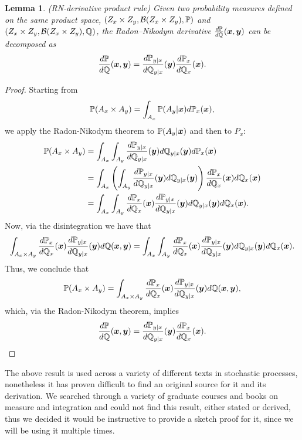 \documentclass[a4paper,12pt,twoside,openright]{report}
\newtheorem{lemma}{Lemma}
\theoremstyle{definition}
\begin{document}
\begin{lemma}\label{lemma:rn_des}(RN-derivative product rule)
Given two probability measures defined on the same product space,  $(Z_x \times Z_y, {\mathcal{B}}(Z_x \times Z_y) ,{\mathbb{P}})$ and $(Z_x \times Z_y, {\mathcal{B}}(Z_x \times Z_y) ,{\mathbb{Q}})$, the Radon–Nikodym derivative $\frac{d{\mathbb{P}}}{d{\mathbb{Q}}} ({\bm{x}},{\bm{y}})$ can be decomposed as
\begin{align}
    \frac{d{\mathbb{P}}}{d{\mathbb{Q}}} ({\bm{x}},{\bm{y}}) = \frac{d{\mathbb{P}}_{y|x}}{d{\mathbb{Q}}_{y|x}}({\bm{y}})\frac{d{\mathbb{P}}_x}{d{\mathbb{Q}}_x}({\bm{x}}).
\end{align}
\end{lemma}
\begin{proof}

Starting from
\begin{align*}
    {\mathbb{P}}(A_x \times A_y) =  \int_{A_x}{\mathbb{P}}(A_y | {\bm{x}})  d{\mathbb{P}}_{x}({\bm{x}}),
\end{align*}
we apply the Radon-Nikodym theorem to ${\mathbb{P}}(A_y | {\bm{x}})$ and then to $P_x$:
\begin{align*}
    {\mathbb{P}}(A_x \times A_y) &=  \int_{A_x}\int_{A_y} \frac{d{\mathbb{P}}_{y|x}}{d{\mathbb{Q}}_{y|x}}({\bm{y}}) d{\mathbb{Q}}_{y|x}({\bm{y}}) d{\mathbb{P}}_{x}({\bm{x}}) \\
     &= \int_{A_x}\left(\int_{A_y} \frac{d{\mathbb{P}}_{y|x}}{d{\mathbb{Q}}_{y|x}}({\bm{y}}) d{\mathbb{Q}}_{y|x}({\bm{y}})\right) \frac{d{\mathbb{P}}_{x}}{d{\mathbb{Q}}_{x}}({\bm{x}})d{\mathbb{Q}}_{x}({\bm{x}}) \\
      &= \int_{A_x}\int_{A_y}\frac{d{\mathbb{P}}_{x}}{d{\mathbb{Q}}_{x}}({\bm{x}})\frac{d{\mathbb{P}}_{y|x}}{d{\mathbb{Q}}_{y|x}}({\bm{y}}) d{\mathbb{Q}}_{y|x}({\bm{y}}) d{\mathbb{Q}}_{x}({\bm{x}}).
\end{align*}
Now, via the disintegration we have that
\begin{align*}
  \int_{A_x \times A_y} \frac{d{\mathbb{P}}_{x}}{d{\mathbb{Q}}_{x}}({\bm{x}})\frac{d{\mathbb{P}}_{y|x}}{d{\mathbb{Q}}_{y|x}}({\bm{y}}) d{\mathbb{Q}}({\bm{x}},{\bm{y}}) = \int_{A_x}\int_{A_y}\frac{d{\mathbb{P}}_{x}}{d{\mathbb{Q}}_{x}}({\bm{x}})\frac{d{\mathbb{P}}_{y|x}}{d{\mathbb{Q}}_{y|x}}({\bm{y}}) d{\mathbb{Q}}_{y|x}({\bm{y}}) d{\mathbb{Q}}_{x}({\bm{x}}).
\end{align*}
Thus, we conclude that
\begin{align*}
    {\mathbb{P}}(A_x \times A_y) = \int_{A_x \times A_y} \frac{d{\mathbb{P}}_{x}}{d{\mathbb{Q}}_{x}}({\bm{x}})\frac{d{\mathbb{P}}_{y|x}}{d{\mathbb{Q}}_{y|x}}({\bm{y}}) d{\mathbb{Q}}({\bm{x}},{\bm{y}}), 
\end{align*}
which, via the Radon-Nikodym theorem, implies
\begin{align*}
    \frac{d{\mathbb{P}}}{d{\mathbb{Q}}} ({\bm{x}},{\bm{y}}) = \frac{d{\mathbb{P}}_{y|x}}{d{\mathbb{Q}}_{y|x}}({\bm{y}})\frac{d{\mathbb{P}}_x}{d{\mathbb{Q}}_x}({\bm{x}}).
\end{align*}
\end{proof}
The above result is used across a variety of different texts in stochastic processes, nonetheless it has proven difficult to find an original source for it and its derivation. We searched through a variety of graduate courses and books on measure and integration and could not find this result, either stated or derived, thus we decided it would be instructive to provide a sketch proof for it, since we will be using it multiple times.
\end{document}
